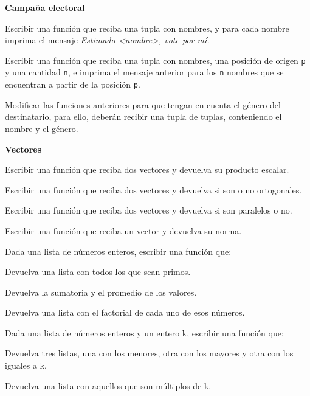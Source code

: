 \begin{ejercicio}{\bf Campaña electoral}
\begin{partes}
\item Escribir una función que reciba una tupla con nombres, y para cada
nombre imprima el mensaje {\it Estimado <nombre>, vote por mí.}
\item Escribir una función que reciba una tupla con nombres, una posición
de origen \verb!p! y una cantidad \verb!n!, e imprima el mensaje anterior
para los \verb!n! nombres que se encuentran a partir de la posición
\verb!p!.
\item Modificar las funciones anteriores para que tengan en cuenta el
género del destinatario, para ello, deberán recibir una tupla de tuplas,
conteniendo el nombre y el género.
\end{partes}
\end{ejercicio}


\begin{ejercicio}
{\bf Vectores}
\begin{partes}
\item Escribir una función que reciba dos vectores y devuelva su producto
escalar.
\item Escribir una función que reciba dos vectores y devuelva si son o no
ortogonales.
\item Escribir una función que reciba dos vectores y devuelva si son
paralelos o no.
\item Escribir una función que reciba un vector y devuelva su norma.
\end{partes}
\end{ejercicio}


\begin{ejercicio}
Dada una lista de números enteros, escribir una función que:
\begin{partes}
\item Devuelva una lista con todos los que sean primos.
\item Devuelva la sumatoria y el promedio de los valores.
\item Devuelva una lista con el factorial de cada uno de esos números.
\end{partes}
\end{ejercicio}


\begin{ejercicio}
Dada una lista de números enteros y un entero k, escribir una función que:
\begin{partes}
\item Devuelva tres listas, una con los menores, otra con los mayores y
otra con los iguales a k.
\item Devuelva una lista con aquellos que son múltiplos de k.
\end{partes}
\end{ejercicio}


